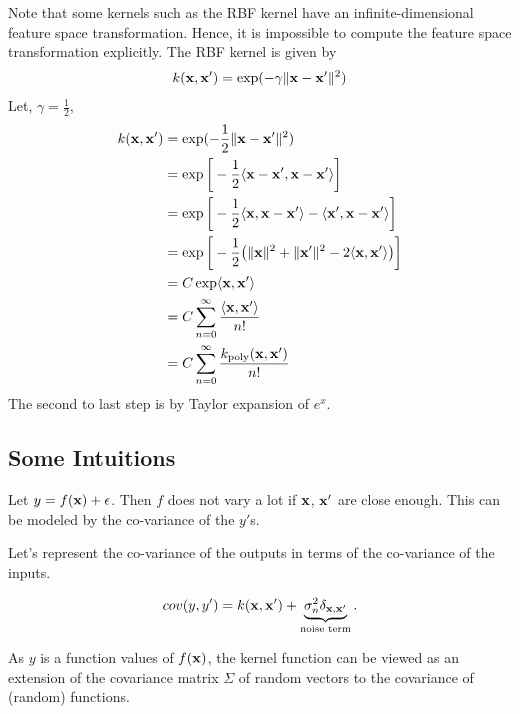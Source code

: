 Note that some kernels such as the RBF kernel have an infinite-dimensional feature space transformation. Hence, it is impossible to compute the feature space transformation explicitly. The RBF kernel is given by
\begin{align*}
	k({\mathbf{x}}, {\mathbf{x}}') = \exp(-\gamma \|{\mathbf{x}}-{\mathbf{x}}'\|^2)
\end{align*}
Let, $\gamma=\frac{1}{2}$, 
\begin{align*}
	k({\mathbf{x}}, {\mathbf{x}}') &= \exp(-\frac{1}{2} \|{\mathbf{x}}-{\mathbf{x}}'\|^2)\\
				   &= \exp\bigg[-\frac{1}{2} \langle {\mathbf{x}}-{\mathbf{x}}', {\mathbf{x}}-{\mathbf{x}}' \rangle \bigg]\\
				   &= \exp\bigg[-\frac{1}{2} \langle {\mathbf{x}}, {\mathbf{x}}-{\mathbf{x}}' \rangle-\langle {\mathbf{x}}', {\mathbf{x}}-{\mathbf{x}}' \rangle\bigg]\\
				   &= \exp\bigg[-\frac{1}{2} \big(\|{\mathbf{x}}\|^2+\|{\mathbf{x}}'\|^2-2 \langle {\mathbf{x}}, {\mathbf{x}}' \rangle\big) \bigg]\\
				   &= C\exp\langle {\mathbf{x}}, {\mathbf{x}}' \rangle\\
				   &= C\sum_{n=0}^\infty \frac{\langle {\mathbf{x}}, {\mathbf{x}}' \rangle}{n!}\\
				   &= C\sum_{n=0}^\infty \frac{k_{\textrm{poly}}({\mathbf{x}}, {\mathbf{x}}')}{n!}\\
\end{align*}
The second to last step is by Taylor expansion of $e^x$.

\subsection{Some Intuitions}

Let $y=f({\mathbf{x}})+\epsilon$. Then $f$ does not vary a lot if ${\mathbf{x}}$, ${\mathbf{x}}'$ are close enough. This can be modeled by the co-variance of the $y'$s.

Let's represent the co-variance of the outputs in terms of the co-variance of the inputs. 

$$cov(y,y') = k({\mathbf{x}}, {\mathbf{x}}')+\underbrace{\sigma_n^2\delta_{{\mathbf{x}},{\mathbf{x}}'}}_{\textrm{noise term}}.$$

As $y$ is a function values of $f({\mathbf{x}})$, the kernel function can be viewed as an extension of the covariance matrix $\Sigma$ of random vectors to the covariance of (random) functions. 


